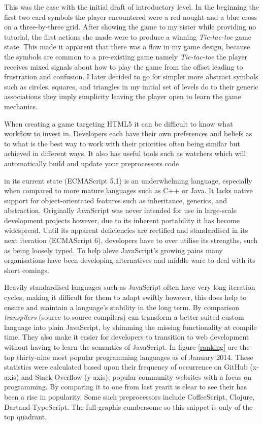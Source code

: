 \documentclass[final]{cmpreport}
\begin{document}
This was the case with the initial draft of introductory level. In the beginning the first two card symbols the player encountered were a red nought and a blue cross on a three-by-three grid. After showing the game to my sister while providing no tutorial, the first actions she made were to produce a winning \emph{Tic-tac-toe} game state. This made it apparent that there was a flaw in my game design, because the symbols are common to a pre-existing game namely \emph{Tic-tac-toe} the player receives mixed signals about how to play the game from the offset leading to frustration and confusion. I later decided to go for simpler more abstract symbols such as circles, squares, and triangles in my initial set of levels do to their generic associations they imply simplicity leaving the player open to learn the game mechanics.

When creating a game targeting HTML5 it can be difficult to know what workflow to invest in. Developers each have their own preferences and beliefs as to what is the best way to work with their priorities often being similar but achieved in different ways. It also has useful tools such as watchers which will automatically build and update your preprocessors code

\label{sec:transpilers}




 in its current state (ECMAScript 5.1) is an underwhelming language, especially when compared to more mature languages such as C++ or Java. It lacks native support for object-orientated features such as inheritance, generics, and abstraction. Originally JavaScript was never intended for use in large-scale development projects however, due to its inherent portability it has become widespread. Until its apparent deficiencies are rectified and standardised in its next iteration (ECMAScript 6), developers have to over utilise its strengths, such as being loosely typed. To help aleve JavaScript's growing pains many organisations have been developing alternatives and middle ware to deal with its short comings.

Heavily standardised languages such as JavaScript often have very long iteration cycles, making it difficult for them to adapt swiftly however, this does help to ensure and maintain a language's stability in the long term. By comparison \textit{transpilers} (source-to-source compilers) can transform a better suited custom language into plain JavaScript, by shimming the missing functionality at compile time. They also make it easier for developers to transition to web development without having to learn the semantics of JavaScript. In figure \ref{ranking} are the top thirty-nine most popular programming languages as of January 2014. These statistics were calculated based upon their frequency of occurrence on GitHub (x-axis) and Stack Overflow (y-axis); popular community websites with a focus on programming. By comparing it to one from last year\footnotemark it is clear to see their has been a rise in popularity. Some such preprocessors include CoffeeScript\footnotemark, Clojure\footnotemark, Dart\footnotemark and TypeScript\footnotemark. The full graph\footnotemark is cumbersome so this snippet is only of the top quadrant.
\end{document}
